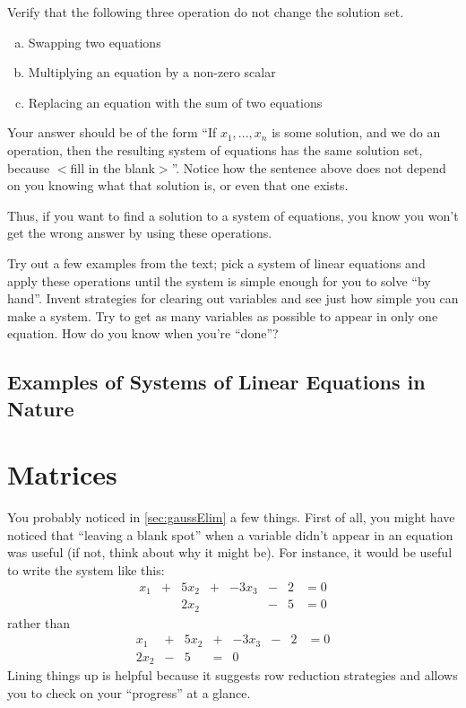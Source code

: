 \documentclass[Main.tex]{subfiles}
\begin{document}
\begin{Ex}
  \label{sec:gaussElimRules}
  Verify that the following three operation do not change the solution set.  
  \begin{enumerate}[a)]
  \item Swapping two equations
  \item Multiplying an equation by a non-zero scalar
  \item Replacing an equation with the sum of two equations
  \end{enumerate}
  Your answer should be of the form ``If $x_1,...,x_n$ is some solution, and we do an operation, then the resulting system of equations has the same solution set, because $<$fill in the blank$>$''.  Notice how the sentence above does not depend on you knowing what that solution is, or even that one exists.  
\end{Ex}

Thus, if you want to find a solution to a system of equations, you know you won't get the wrong answer by using these operations.  
\begin{ImpEx}
  \label{sec:gaussElim}
  Try out a few examples from the text; pick a system of linear equations and apply these operations until the system is simple enough for you to solve ``by hand''.
  Invent strategies for clearing out variables and see just how simple you can make a system.
  Try to get as many variables as possible to appear in only one equation.
  How do you know when you're ``done''?
\end{ImpEx}


\subsection{Examples of Systems of Linear Equations in Nature}

\exersisese

\section{Matrices}

You probably noticed in \ref{sec:gaussElim} a few things.
First of all, you might have noticed that ``leaving a blank spot'' when a variable didn't appear in an equation was useful (if not, think about why it might be).  
For instance, it would be useful to write the system like this:
\[\begin{array}{ccccccccc}
  x_1 & + & 5x_2 & + & -3x_3 & - & 2 & = 0\\
   &  & 2x_2 & &  & - & 5 & = 0
\end{array}\]
rather than
\[\begin{array}{ccccccccc}
  x_1 & + & 5x_2 & + & -3x_3 & - & 2 & = 0\\
   2x_2 & -& 5 & = & 0
\end{array}\]
Lining things up is helpful because it suggests row reduction strategies and allows you to check on your ``progress'' at a glance.
\end{document}
